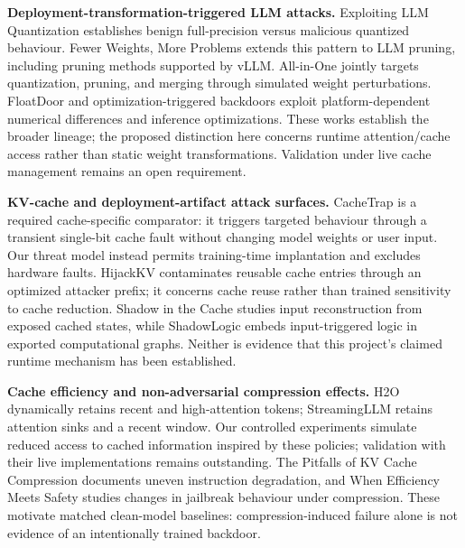 \documentclass[11pt,a4paper]{article}
\begin{document}
\textbf{Deployment-transformation-triggered LLM attacks.} Exploiting LLM Quantization \cite{egashira2024quantization} establishes benign full-precision versus malicious quantized behaviour. Fewer Weights, More Problems \cite{egashira2026pruning} extends this pattern to LLM pruning, including pruning methods supported by vLLM. All-in-One \cite{zhan2026allinone} jointly targets quantization, pruning, and merging through simulated weight perturbations. FloatDoor \cite{loose2026floatdoor} and optimization-triggered backdoors \cite{optimtrigger2026} exploit platform-dependent numerical differences and inference optimizations. These works establish the broader lineage; the proposed distinction here concerns runtime attention/cache access rather than static weight transformations. Validation under live cache management remains an open requirement.

\textbf{KV-cache and deployment-artifact attack surfaces.} CacheTrap \cite{alnahian2026cachetrap} is a required cache-specific comparator: it triggers targeted behaviour through a transient single-bit cache fault without changing model weights or user input. Our threat model instead permits training-time implantation and excludes hardware faults. HijackKV \cite{zhang2026hijackkv} contaminates reusable cache entries through an optimized attacker prefix; it concerns cache reuse rather than trained sensitivity to cache reduction. Shadow in the Cache \cite{luo2026shadow} studies input reconstruction from exposed cached states, while ShadowLogic \cite{schulz2025shadowlogic} embeds input-triggered logic in exported computational graphs. Neither is evidence that this project's claimed runtime mechanism has been established.

\textbf{Cache efficiency and non-adversarial compression effects.} H2O \cite{zhang2023h2o} dynamically retains recent and high-attention tokens; StreamingLLM \cite{xiao2024streaming} retains attention sinks and a recent window. Our controlled experiments simulate reduced access to cached information inspired by these policies; validation with their live implementations remains outstanding. The Pitfalls of KV Cache Compression \cite{chen2026pitfalls} documents uneven instruction degradation, and When Efficiency Meets Safety \cite{ma2026efficiency} studies changes in jailbreak behaviour under compression. These motivate matched clean-model baselines: compression-induced failure alone is not evidence of an intentionally trained backdoor.
\end{document}
